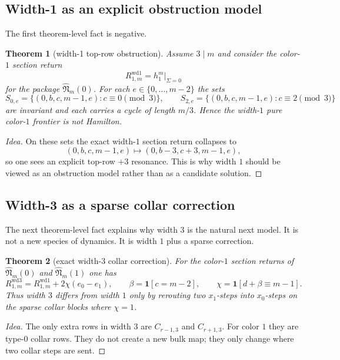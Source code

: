 \documentclass[11pt]{article}
\newtheorem{theorem}{Theorem}[section]
\newcommand{\wdone}{\widehat{\mathfrak N}_m(0)}
\newcommand{\wdthree}{\widehat{\mathfrak N}_m(1)}
\begin{document}
\subsection{Width-1 as an explicit obstruction model}

The first theorem-level fact is negative.

\begin{theorem}[width-1 top-row obstruction]
Assume $3\mid m$ and consider the color-$1$ section return
\[
R^{\mathrm{wd1}}_{1,m}=h_1^m\big|_{\Sigma=0}
\]
for the package $\wdone$.
For each $e\in\{0,\dots,m-2\}$ the sets
\[
S_{0,e}=\{(0,b,c,m-1,e):c\equiv 0\pmod3\},
\qquad
S_{2,e}=\{(0,b,c,m-1,e):c\equiv 2\pmod3\}
\]
are invariant and each carries a cycle of length $m/3$.
Hence the width-$1$ pure color-$1$ frontier is not Hamilton.
\end{theorem}

\begin{proof}[Idea]
On these sets the exact width-$1$ section return collapses to
\[
(0,b,c,m-1,e)\mapsto (0,b-3,c+3,m-1,e),
\]
so one sees an explicit top-row $+3$ resonance.
This is why width $1$ should be viewed as an obstruction model rather than as a
candidate solution.
\end{proof}

\subsection{Width-3 as a sparse collar correction}

The next theorem-level fact explains why width $3$ is the natural next model.
It is not a new species of dynamics.
It is width $1$ plus a sparse correction.

\begin{theorem}[exact width-3 collar correction]
For the color-$1$ section returns of $\wdone$ and $\wdthree$ one has
\[
R^{\mathrm{wd3}}_{1,m}=R^{\mathrm{wd1}}_{1,m}+2\chi(e_0-e_1),
\qquad
\beta=\mathbf 1[c=m-2],\qquad
\chi=\mathbf 1[d+\beta\equiv m-1].
\]
Thus width $3$ differs from width $1$ only by rerouting two $x_1$-steps into
$x_0$-steps on the sparse collar blocks where $\chi=1$.
\end{theorem}

\begin{proof}[Idea]
The only extra rows in width $3$ are $C_{r-1,3}$ and $C_{r+1,3}$.
For color $1$ they are type-$0$ collar rows.
They do not create a new bulk map; they only change where two collar steps are
sent.
\end{proof}
\end{document}
